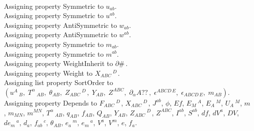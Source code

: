 \documentclass[11pt]{article}
\begin{document}
\\
Assigning property Symmetric to ${u}_{a b}$.
\\
Assigning property Symmetric to ${u}^{a b}$.
\\
Assigning property AntiSymmetric to ${w}_{a b}$.
\\
Assigning property AntiSymmetric to ${w}^{a b}$.
\\
Assigning property Symmetric to ${m}_{a b}$.
\\
Assigning property Symmetric to ${m}^{a b}$.
\\
Assigning property WeightInherit to $\partial{\#}\, $.
\\
Assigning property Weight to ${X}_{A B C}\,^{D\, }$.
\\
Assigning list property SortOrder to $({u}^{A}\,_{B},\; {T}^{\alpha}\,_{A B},\; {\theta}_{A B},\; {Z}_{A B C}\,^{D\, },\; {Y}_{A B},\; {Z}^{A B C},\; {\partial}_{\alpha}{A??}\, ,\; {\epsilon}^{A B C D\,  E},\; {\epsilon}_{A B C D\,  E},\; {m}_{A B})$.
\\
Assigning property Depends to ${F}_{A B C}\,^{D\, }$, ${X}_{A B C}\,^{D\, }$, ${J}^{a b}$, $\phi$, $Ef$, ${E}_{M}\,^{A}$, ${E}_{A}\,^{M}$, ${U}_{A}\,^{M}$, $m$, ${m}_{M N}$, ${m}^{M N}$, ${T}^{\alpha}\,_{A B}$, ${q}_{A B}$, ${f}_{A B}$, ${Q}_{A B}$, ${Y}_{A B}$, ${Z}_{A B C}\,^{D\, }$, ${Z}^{A B C}$, ${I}^{a b}$, ${S}^{a b}$, $df$, ${dV}^{a}$, $DV$, ${de}_{m}\,^{a}$, ${d}_{a}$, ${f}_{a b}\,^{c}$, ${\theta}_{A B}$, ${e}_{a}\,^{m}$, ${e}_{m}\,^{a}$, ${V}^{a}$, ${V}^{m}$, $e$, ${f}_{a}$.
\\
\end{document}
